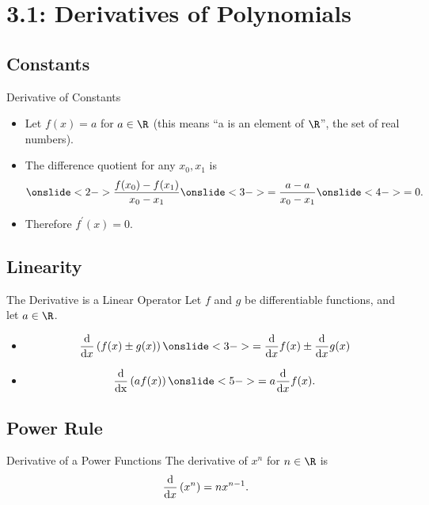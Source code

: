 \documentclass[Lecture.tex]{subfiles}
\begin{document}
\section{3.1: Derivatives of Polynomials}
\subsection{Constants}
\begin{frame}{Derivative of Constants}
  \begin{itemize}
  \item<1->
    Let $f(x) = a$ for $a \in \R$ (this means ``a is an element of $\R$'', the set of real numbers).
  \item<2->
    The difference quotient for any $x_0, x_1$ is
    $$\onslide<2->{\frac{f(x_0) - f(x_1)}{x_0 - x_1}}\onslide<3->{= \frac{a - a }{x_0 - x_1}}\onslide<4->{ = 0.}$$
  \item<5->
    Therefore $f^\prime(x) = 0$.
  \end{itemize}
\end{frame}

\subsection{Linearity}
\begin{frame}{The Derivative is a Linear Operator}
  Let $f$ and $g$ be differentiable functions, and let $a \in \R$.
  \begin{itemize}
  \item<2->
    $$\ddx{x}\left(f(x) \pm g(x)\right) \onslide<3->{= \ddx{x}f(x) \pm \ddx{x}g(x)}$$
  \item<4->
    $$\frac{\operatorname{d}}{\operatorname{dx}}\left(af(x)\right) \onslide<5->{= a \ddx{x}f(x).}$$
  \end{itemize}
\end{frame}

\subsection{Power Rule}

\begin{frame}{Derivative of a Power Functions}
  The derivative of $x^n$ for $n \in \R$ is 
  $$\frac{\operatorname{d}}{\operatorname{d}\!x}\left(x^n\right) = nx^{n-1}.$$

\end{frame}
\end{document}
